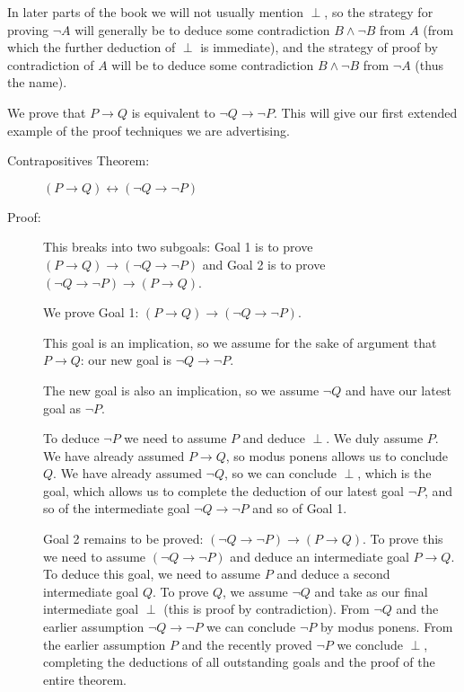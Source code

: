 \documentclass[12pt]{book}
\begin{document}
In later parts of the book we will not usually mention $\perp$, so the strategy for proving $\neg A$ will
generally be to deduce some contradiction $B \wedge \neg B$ from $A$ (from which the further deduction
of $\perp$ is immediate), and the strategy of proof by contradiction of $A$ will be to deduce some contradiction
$B \wedge \neg B$ from $\neg A$ (thus the name).

We prove that $P \rightarrow Q$ is equivalent to $\neg Q \rightarrow
\neg P$.  This will give our first extended example of the proof
techniques we are advertising.

\newpage

\begin{description}

\item[Contrapositives Theorem:]  $(P \rightarrow Q) \leftrightarrow (\neg Q
\rightarrow \neg P)$

\item[Proof:]
This breaks into two subgoals: Goal 1 is to prove $(P \rightarrow Q)
\rightarrow (\neg Q \rightarrow \neg P)$ and Goal 2 is to prove $(\neg Q \rightarrow
\neg P) \rightarrow (P \rightarrow Q)$.

We prove Goal 1: $(P \rightarrow Q) \rightarrow (\neg Q \rightarrow \neg P)$.

This goal is an implication, so we assume for the sake of argument
that $P \rightarrow Q$:  our new goal is $\neg Q \rightarrow \neg P$.

The new goal is also an implication, so we assume $\neg Q$ and have our latest goal as $\neg P$.

To deduce $\neg P$ we need to assume $P$ and deduce $\perp$.
We duly assume $P$.  We have already assumed $P \rightarrow Q$, so
modus ponens allows us to conclude $Q$.  We have already assumed $\neg
Q$, so we can conclude $\perp$, which is the goal, which allows us to complete the deduction of our latest
goal $\neg P$, and so of the intermediate goal $\neg Q \rightarrow
\neg P$ and so of Goal 1.

Goal 2 remains to be proved: $(\neg Q \rightarrow \neg P) \rightarrow
(P \rightarrow Q)$.  To prove this we need to assume $(\neg Q
\rightarrow \neg P)$ and deduce an intermediate goal $P \rightarrow
Q$.  To deduce this goal, we need to assume $P$ and deduce a second
intermediate goal $Q$.  To prove $Q$, we assume $\neg Q$ and take as
our final intermediate goal $\perp$ (this is proof by
contradiction).  From $\neg Q$ and the earlier assumption $\neg Q
\rightarrow \neg P$ we can conclude $\neg P$ by modus ponens.  From
the earlier assumption $P$ and the recently proved $\neg P$ we
conclude $\perp$, completing the deductions
of all outstanding goals and the proof of the entire theorem.

\end{description}
\end{document}
